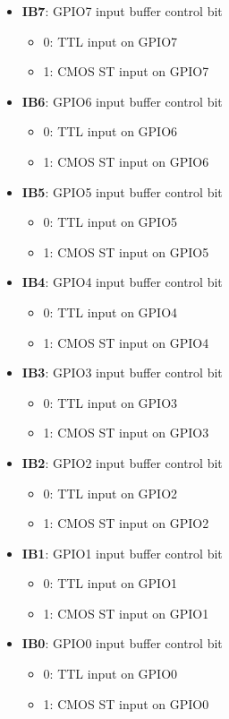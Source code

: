 \documentclass{article}
\begin{document}
	\begin{itemize}
		\item \textbf{IB7}: GPIO7 input buffer control bit
		\begin{itemize}
			\item 0: TTL input on GPIO7
			\item 1: CMOS ST input on GPIO7
		\end{itemize}
		\item \textbf{IB6}: GPIO6 input buffer control bit
		\begin{itemize}
			\item 0: TTL input on GPIO6
			\item 1: CMOS ST input on GPIO6
		\end{itemize}
		\item \textbf{IB5}: GPIO5 input buffer control bit
		\begin{itemize}
			\item 0: TTL input on GPIO5
			\item 1: CMOS ST input on GPIO5
		\end{itemize}
		\item \textbf{IB4}: GPIO4 input buffer control bit
		\begin{itemize}
			\item 0: TTL input on GPIO4
			\item 1: CMOS ST input on GPIO4
		\end{itemize}
		\item \textbf{IB3}: GPIO3 input buffer control bit
		\begin{itemize}
			\item 0: TTL input on GPIO3
			\item 1: CMOS ST input on GPIO3
		\end{itemize}
		\item \textbf{IB2}: GPIO2 input buffer control bit
		\begin{itemize}
			\item 0: TTL input on GPIO2
			\item 1: CMOS ST input on GPIO2
		\end{itemize}
		\item \textbf{IB1}: GPIO1 input buffer control bit
		\begin{itemize}
			\item 0: TTL input on GPIO1
			\item 1: CMOS ST input on GPIO1
		\end{itemize}
		\item \textbf{IB0}: GPIO0 input buffer control bit
		\begin{itemize}
			\item 0: TTL input on GPIO0
			\item 1: CMOS ST input on GPIO0
		\end{itemize}
	\end{itemize}
	
\end{document}
